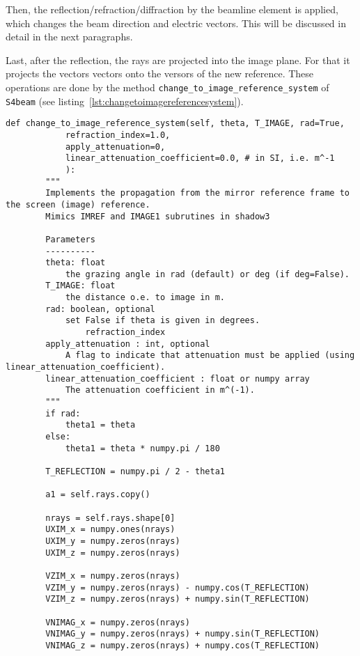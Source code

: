 \documentclass{iucr}
\begin{document}
Then, the reflection/refraction/diffraction by the beamline element is applied, which changes the beam direction and electric vectors.
This will be discussed in detail in the next paragraphs.

Last, after the reflection, the rays are projected into the image plane.
For that it projects the vectors  vectors onto the versors of the new reference. 
These operations are done by the method {\tt change\_to\_image\_reference\_system} of {\tt S4beam} (see listing~\ref{lst:changetoimagereferencesystem}).

\begin{lstlisting}[caption={Method of {\tt S4Beam} that changes the reference and propagates the beam from the beamline element to the image plane.}, label={lst:changetoimagereferencesystem}, captionpos=b]
   def change_to_image_reference_system(self, theta, T_IMAGE, rad=True,
            refraction_index=1.0,
            apply_attenuation=0,
            linear_attenuation_coefficient=0.0, # in SI, i.e. m^-1
            ):
        """
        Implements the propagation from the mirror reference frame to the screen (image) reference.
        Mimics IMREF and IMAGE1 subrutines in shadow3

        Parameters
        ----------
        theta: float
            the grazing angle in rad (default) or deg (if deg=False).
        T_IMAGE: float
            the distance o.e. to image in m.
        rad: boolean, optional
            set False if theta is given in degrees.
                refraction_index
        apply_attenuation : int, optional
            A flag to indicate that attenuation must be applied (using linear_attenuation_coefficient).
        linear_attenuation_coefficient : float or numpy array
            The attenuation coefficient in m^(-1).
        """
        if rad:
            theta1 = theta
        else:
            theta1 = theta * numpy.pi / 180

        T_REFLECTION = numpy.pi / 2 - theta1

        a1 = self.rays.copy()

        nrays = self.rays.shape[0]
        UXIM_x = numpy.ones(nrays)
        UXIM_y = numpy.zeros(nrays)
        UXIM_z = numpy.zeros(nrays)

        VZIM_x = numpy.zeros(nrays)
        VZIM_y = numpy.zeros(nrays) - numpy.cos(T_REFLECTION)
        VZIM_z = numpy.zeros(nrays) + numpy.sin(T_REFLECTION)

        VNIMAG_x = numpy.zeros(nrays)
        VNIMAG_y = numpy.zeros(nrays) + numpy.sin(T_REFLECTION)
        VNIMAG_z = numpy.zeros(nrays) + numpy.cos(T_REFLECTION)


\end{lstlisting}
\end{document}
